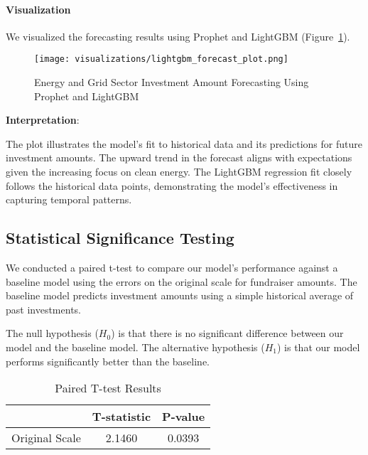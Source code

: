 \documentclass[sigconf]{acmart}
\begin{document}
\paragraph{Visualization}

We visualized the forecasting results using Prophet and LightGBM (Figure~\ref{fig:forecast_plot}).

\begin{figure}[htpb]
    \centering
    \texttt{[image: visualizations/lightgbm\_forecast\_plot.png]}
    \caption{Energy and Grid Sector Investment Amount Forecasting Using Prophet and LightGBM}
    \label{fig:forecast_plot}
\end{figure}

\textbf{Interpretation}:

The plot illustrates the model's fit to historical data and its predictions for future investment amounts. The upward trend in the forecast aligns with expectations given the increasing focus on clean energy. The LightGBM regression fit closely follows the historical data points, demonstrating the model's effectiveness in capturing temporal patterns.

\subsection{Statistical Significance Testing}

We conducted a paired t-test to compare our model's performance against a baseline model using the errors on the original scale for fundraiser amounts. The baseline model predicts investment amounts using a simple historical average of past investments.

The null hypothesis ($H_0$) is that there is no significant difference between our model and the baseline model. The alternative hypothesis ($H_1$) is that our model performs significantly better than the baseline.

\begin{table}[htpb]
    \centering
    \caption{Paired T-test Results}
    \label{tab:t_test_results}
    \begin{tabular}{lcc}
        \toprule
        & \textbf{T-statistic} & \textbf{P-value} \\
        \midrule
        Original Scale & 2.1460 & 0.0393 \\
        \bottomrule
    \end{tabular}
\end{table}
\end{document}
